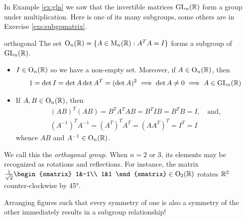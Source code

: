 In Example \ref{ex:gln} we saw that the invertible matrices $\mathrm{GL}_n(\mathbb{R})$ form a group under multiplication. Here is one of its many subgroups, some others are in Exercise \ref{exs:subgpmatrix}.

\begin{example}{}{orthogonal}
The set $\mathrm{O}_n(\mathbb{R})=\{A\in\mathrm{M}_n(\mathbb{R}):A^TA=I\}$ forms a subgroup of $\mathrm{GL}_n(\mathbb{R})$.
	\begin{itemize}\itemsep0pt
	  \item $I\in \mathrm{O}_n(\mathbb{R})$ so we have a non-empty set. Moreover, if $A\in \mathrm{O}_n(\mathbb{R})$, then
	  \[
	  	1=\det I=\det A\det A^T=(\det A)^2\implies \det A\neq 0\implies A\in\mathrm{GL}_n(\mathbb{R})
	  \]
	  \item If $A,B\in\mathrm{O}_n(\mathbb{R})$, then
	  \begin{gather*}
	  	(AB)^T(AB)=B^TA^TAB=B^TIB=B^TB=I,\quad\text{and,}\\
	  	(A^{-1})^TA^{-1}=(A^T)^TA^T=(AA^T)^T=I^T=I
	  \end{gather*}
	  whence $AB$ and $A^{-1}\in\mathrm{O}_n(\mathbb{R})$.
	\end{itemize}
	We call this the \emph{orthogonal group.} When $n=2$ or 3, its elements may be recognized as rotations and reflections. For instance, the matrix $\frac 1{\sqrt 2}
	\begin{smatrix}
		1&-1\\
		1&1
	\end{smatrix}
	\in\rO_2(\R)$ rotates $\mathbb{R}^2$ counter-clockwise by \ang{45}.
\end{example}



\hypertarget{sec:geomdih}{}

Arranging figures such that every symmetry of one is also a symmetry of the other immediately results in a subgroup relationship!




